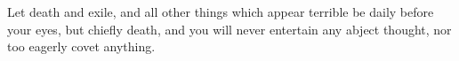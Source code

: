 Let death and exile, and all other things which appear terrible be daily before
your eyes, but chiefly death, and  you will never entertain any abject thought,
nor too eagerly covet anything.
